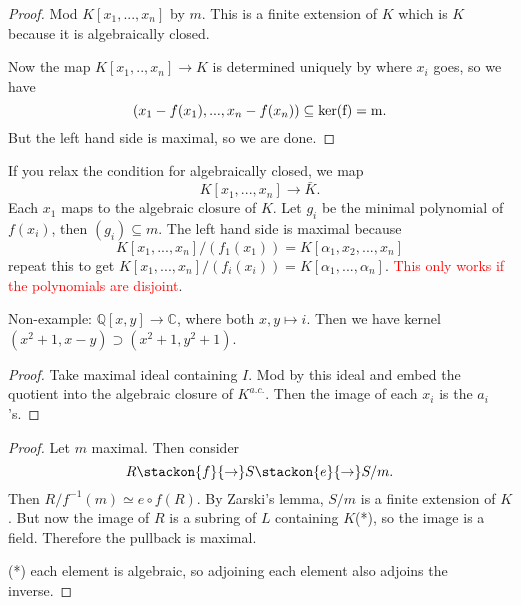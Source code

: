 \begin{proof}
    Mod $K[x_1,...,x_n]$ by $m$. This is a finite extension of $K$ which is $K$ because it is algebraically closed.
    
    Now the map $K[x_1,..,x_n]\to K$ is determined uniquely by where $x_i$ goes, so we have \[
    (x_1-f(x_1),...,x_n-f(x_n))\subseteq \rm{ker}(f)= m.
    \]
    But the left hand side is maximal, so we are done. 
\end{proof}

\begin{remark}
    If you relax the condition for algebraically closed, we map \[
    K[x_1,...,x_n]\to \bar{K}.
    \]
    Each $x_1$ maps to the algebraic closure of $K$. 
    Let $g_i$ be the minimal polynomial of $f(x_i)$, then $(g_i)\subseteq m$. The left hand side is maximal because \[
    K[x_1,...,x_n]/(f_1(x_1))=K[\alpha_1,x_2,...,x_n]
    \]
    repeat this to get $K[x_1,...,x_n]/(f_i(x_i))=K[\alpha_1,...,\alpha_n]$.
    \textcolor{red}{This only works if the polynomials are disjoint}.

    Non-example: $\mathbb{Q}[x,y]\to \mathbb{C}$, where both $x,y\mapsto i$. Then we have kernel $(x^2+1,x-y)\supset (x^2+1,y^2+1)$.
\end{remark}


\begin{proof}
    Take maximal ideal containing $I$. Mod by this ideal and embed the quotient into the algebraic closure of $K^{a.c.}$. Then the image of each $x_i$ is the $a_i$'s.
\end{proof}

\begin{proof}
    Let $m$ maximal. Then consider \[
    R\stackon{f}{\to} S\stackon{e}{\to} S/m.
    \]
    Then $R/f^{-1}(m)\simeq e\circ f (R)$. By Zarski's lemma, $S/m$ is a finite extension of $K$. But now  the image of $R$ is a subring of $L$ containing $K$(*), so the image is a field. Therefore the pullback is maximal.


    (*) each element is algebraic, so adjoining each element also adjoins the inverse.
\end{proof}